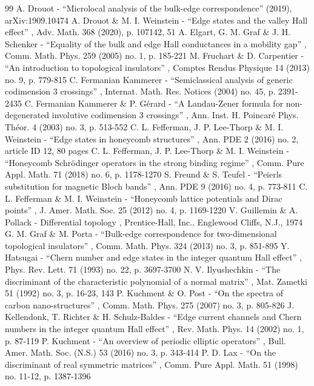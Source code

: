 \documentclass[10pt]{amsart}
\theoremstyle{definition}
\begin{document}
\begin{thebibliography}{99}
 A. Drouot - “Microlocal analysis of the bulk-edge correspondence” (2019), arXiv:1909.10474
 A. Drouot \& M. I. Weinstein - “Edge states and the valley Hall effect” , Adv. Math. 368 (2020), p. 107142, 51
 A. Elgart, G. M. Graf \& J. H. Schenker - “Equality of the bulk and edge Hall conductances in a mobility gap” , Comm. Math. Phys. 259 (2005) no. 1, p. 185-221
 M. Fruchart \& D. Carpentier - “An introduction to topological insulators” , Comptes Rendus Physique 14 (2013) no. 9, p. 779-815
 C. Fermanian Kammerer - “Semiclassical analysis of generic codimension 3 crossings” , Internat. Math. Res. Notices (2004) no. 45, p. 2391-2435
 C. Fermanian Kammerer \& P. Gérard - “A Landau-Zener formula for non-degenerated involutive codimension 3 crossings” , Ann. Inst. H. Poincaré Phys. Théor. 4 (2003) no. 3, p. 513-552
 C. L. Fefferman, J. P. Lee-Thorp \& M. I. Weinstein - “Edge states in honeycomb structures” , Ann. PDE 2 (2016) no. 2, article ID 12, 80 pages
 C. L. Fefferman, J. P. Lee-Thorp \& M. I. Weinstein - “Honeycomb Schrödinger operators in the strong binding regime” , Comm. Pure Appl. Math. 71 (2018) no. 6, p. 1178-1270
 S. Freund \& S. Teufel - “Peierls substitution for magnetic Bloch bands” , Ann. PDE 9 (2016) no. 4, p. 773-811
 C. L. Fefferman \& M. I. Weinstein - “Honeycomb lattice potentials and Dirac points” , J. Amer. Math. Soc. 25 (2012) no. 4, p. 1169-1220
 V. Guillemin \& A. Pollack - Differential topology , Prentice-Hall, Inc., Englewood Cliffs, N.J., 1974
 G. M. Graf \& M. Porta - “Bulk-edge correspondence for two-dimensional topological insulators” , Comm. Math. Phys. 324 (2013) no. 3, p. 851-895
 Y. Hatsugai - “Chern number and edge states in the integer quantum Hall effect” , Phys. Rev. Lett. 71 (1993) no. 22, p. 3697-3700
 N. V. Ilyushechkin - “The discriminant of the characteristic polynomial of a normal matrix” , Mat. Zametki 51 (1992) no. 3, p. 16-23, 143
 P. Kuchment \& O. Post - “On the spectra of carbon nano-structures” , Comm. Math. Phys. 275 (2007) no. 3, p. 805-826
 J. Kellendonk, T. Richter \& H. Schulz-Baldes - “Edge current channels and Chern numbers in the integer quantum Hall effect” , Rev. Math. Phys. 14 (2002) no. 1, p. 87-119
 P. Kuchment - “An overview of periodic elliptic operators” , Bull. Amer. Math. Soc. (N.S.) 53 (2016) no. 3, p. 343-414
 P. D. Lax - “On the discriminant of real symmetric matrices” , Comm. Pure Appl. Math. 51 (1998) no. 11-12, p. 1387-1396

\end{thebibliography}
\end{document}
